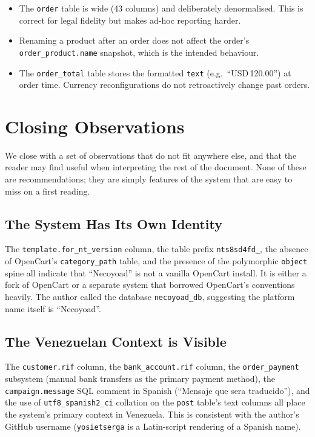 \documentclass[11pt,a4paper]{article}
\begin{document}
\begin{itemize}[leftmargin=1.6em,itemsep=2pt]
  \item The \texttt{order} table is wide (43 columns) and
        deliberately denormalised. This is correct for legal
        fidelity but makes ad-hoc reporting harder.
  \item Renaming a product after an order does not affect the
        order's \texttt{order\_product.name} snapshot, which
        is the intended behaviour.
  \item The \texttt{order\_total} table stores the formatted
        \texttt{text} (e.g.\ ``USD\,120.00'') at order time.
        Currency reconfigurations do not retroactively change
        past orders.
\end{itemize}

\section{Closing Observations}\label{sec:observations}

We close with a set of observations that do not fit anywhere
else, and that the reader may find useful when interpreting
the rest of the document. None of these are recommendations;
they are simply features of the system that are easy to miss
on a first reading.

\subsection{The System Has Its Own Identity}

The \texttt{template.for\_nt\_version} column, the table
prefix \texttt{nts8sd4fd\_}, the absence of OpenCart's
\texttt{category\_path} table, and the presence of the
polymorphic \texttt{object} spine all indicate that
``Necoyoad'' is not a vanilla OpenCart install. It is either
a fork of OpenCart or a separate system that borrowed
OpenCart's conventions heavily. The author called the
database \texttt{necoyoad\_db}, suggesting the platform name
itself is ``Necoyoad''.

\subsection{The Venezuelan Context is Visible}

The \texttt{customer.rif} column, the \texttt{bank\_account.rif}
column, the \texttt{order\_payment} subsystem (manual bank
transfers as the primary payment method), the
\texttt{campaign.message} SQL comment in Spanish (``Mensaje que
sera traducido''), and the use of \texttt{utf8\_spanish2\_ci}
collation on the \texttt{post} table's text columns all place
the system's primary context in Venezuela. This is consistent
with the author's GitHub username (\texttt{yosietserga} is a
Latin-script rendering of a Spanish name).
\end{document}
